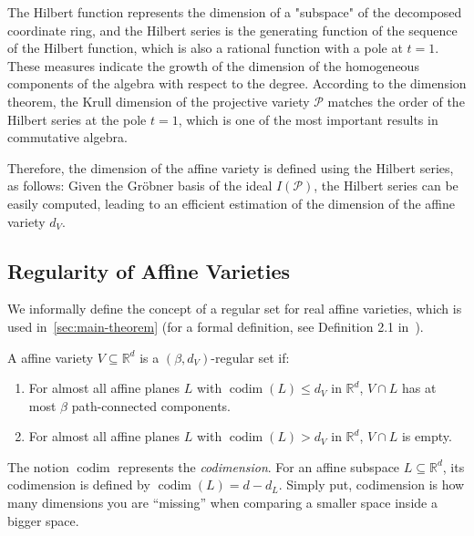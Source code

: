 \documentclass{article}
\theoremstyle{plain}
\theoremstyle{definition}
\theoremstyle{remark}
\begin{document}
The Hilbert function represents the dimension of a "subspace" of the decomposed coordinate ring, and the Hilbert series is the generating function of the sequence of the Hilbert function, which is also a rational function with a pole at \(t = 1\). These measures indicate the growth of the dimension of the homogeneous components of the algebra with respect to the degree. According to the dimension theorem, the Krull dimension of the projective variety \(\mathcal{P}\) matches the order of the Hilbert series at the pole \(t = 1\), which is one of the most important results in commutative algebra.

Therefore, the dimension of the affine variety is defined using the Hilbert series, as follows:
\hilbertSeries*
Given the Gröbner basis of the ideal \(I(\mathcal{P})\), the Hilbert series can be easily computed, leading to an efficient estimation of the dimension of the affine variety \(d_V\).

\subsection{Regularity of Affine Varieties}
\label{app:regularity_of_affinev}
We informally define the concept of a regular set for real affine varieties, which is used in~\cref{sec:main-theorem} (for a formal definition, see Definition 2.1 in~\citep{zhang2023covering}). 

A affine variety \(V \subseteq \mathbb{R}^d\) is a \((\beta, d_V)\)-regular set if:
\begin{enumerate}
    \item For almost all affine planes \(L\) with \(\operatorname{codim}(L) \leq d_V\) in \(\mathbb{R}^d\), \(V \cap L\) has at most \(\beta\) path-connected components.
    \item For almost all affine planes \(L\) with \(\operatorname{codim}(L) > d_V\) in \(\mathbb{R}^d\), \(V \cap L\) is empty.
\end{enumerate}
The notion \(\operatorname{codim}\) represents the \textit{codimension}. For an affine subspace $L \subseteq \mathbb{R}^d$, its codimension is defined by $\operatorname{codim}(L)=d-d_L$.
Simply put, codimension is how many dimensions you are ``missing'' when comparing a smaller space inside a bigger space.
\end{document}
